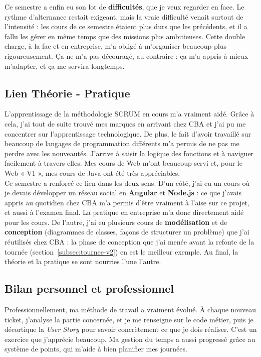 \documentclass{article}
\begin{document}
Ce semestre a enfin eu son lot de \textbf{difficultés}, que je veux regarder en face. Le rythme d'alternance restait exigeant, mais la vraie difficulté venait surtout de l'intensité : les cours de ce semestre étaient plus durs que les précédents, et il a fallu les gérer en même temps que des missions plus ambitieuses. Cette double charge, à la fac et en entreprise, m'a obligé à m'organiser beaucoup plus rigoureusement. Ça ne m'a pas découragé, au contraire : ça m'a appris à mieux m'adapter, et ça me servira longtemps.

\subsection{Lien Théorie - Pratique}

L'apprentissage de la méthodologie SCRUM en cours m'a vraiment aidé. Grâce à cela, j'ai tout de suite trouvé mes marques en arrivant chez CBA et j'ai pu me concentrer sur l'apprentissage technologique. De plus, le fait d'avoir travaillé sur beaucoup de langages de programmation différents m'a permis de ne pas me perdre avec les nouveautés. J'arrive à saisir la logique des fonctions et à naviguer facilement à travers elles. Mes cours de Web m'ont beaucoup servi et, pour le Web « V1 », mes cours de Java ont été très appréciables.\\

Ce semestre a renforcé ce lien dans les deux sens. D'un côté, j'ai eu un cours où je devais développer un réseau social en \textbf{Angular} et \textbf{Node.js} : ce que j'avais appris au quotidien chez CBA m'a permis d'être vraiment à l'aise sur ce projet, et aussi à l'examen final. La pratique en entreprise m'a donc directement aidé pour les cours. De l'autre, j'ai eu plusieurs cours de \textbf{modélisation} et de \textbf{conception} (diagrammes de classes, façons de structurer un problème) que j'ai réutilisés chez CBA : la phase de conception que j'ai menée avant la refonte de la tournée (section~\ref{subsec:tournee-v2}) en est le meilleur exemple. Au final, la théorie et la pratique se sont nourries l'une l'autre.

\subsection{Bilan personnel et professionnel}

Professionnellement, ma méthode de travail a vraiment évolué. À chaque nouveau ticket, j'analyse la partie concernée, et je me renseigne sur le code métier, puis je décortique la \textit{User Story} pour savoir concrètement ce que je dois réaliser. C'est un exercice que j'apprécie beaucoup. Ma gestion du temps a aussi progressé grâce au système de points, qui m'aide à bien planifier mes journées.
\end{document}
